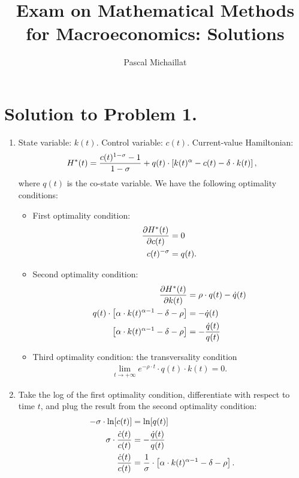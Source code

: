 \documentclass[letterpaper,12pt,leqno]{article}
\begin{document}
\title{Exam on Mathematical Methods for Macroeconomics: Solutions}
\author{Pascal Michaillat}
\date{}

\begin{titlepage}
\maketitle
\end{titlepage}


\section*{Solution to Problem 1.}

\begin{enumerate}
\item State variable: $k(t)$. Control variable: $c(t)$. Current-value Hamiltonian:
\[H^{*}(t)=\frac{c(t)^{1-\sigma}-1}{1-\sigma} +q(t)\cdot \left[k(t)^{\alpha}-c(t)-\delta \cdot k(t)\right],\]
where $q(t)$ is the co-state variable. We have the following optimality conditions:

\begin{itemize}

\item First optimality condition:
\begin{align*}
\frac{\partial H^{*}(t)}{\partial c(t)}&=0\\
c(t)^{-\sigma}&=q(t).
\end{align*}

\item Second optimality condition:
\begin{align*}
\frac{\partial H^{*}(t)}{\partial k(t)}&=\rho\cdot q(t)-\dot{q}(t)\\
q(t)\cdot \left[\alpha\cdot k(t)^{\alpha-1}-\delta -\rho\right]&=-\dot{q}(t)\\
\left[\alpha\cdot k(t)^{\alpha-1}-\delta -\rho\right]&=-\frac{\dot{q}(t)}{q(t)}\\
\end{align*}

\item Third optimality condition: the transversality condition
\begin{align*}
\lim_{t\to +\infty} e^{-\rho\cdot t}\cdot q(t)\cdot k(t)=0.
\end{align*}

\end{itemize}

\item Take the log of the first optimality condition, differentiate with respect to time $t$, and plug the result from the second optimality condition:
\begin{align*}
-\s\cdot \ln [c(t)]&=\ln[q(t)]\\
\s\cdot \frac{\dot{c}(t)}{c(t)}&=-\frac{\dot{q}(t)}{q(t)}\\
\frac{\dot{c}(t)}{c(t)}&=\frac{1}{\s}\cdot \left[\a\cdot k(t)^{\a-1}-\d -\rho\right].
\end{align*}


\end{enumerate}
\end{document}
